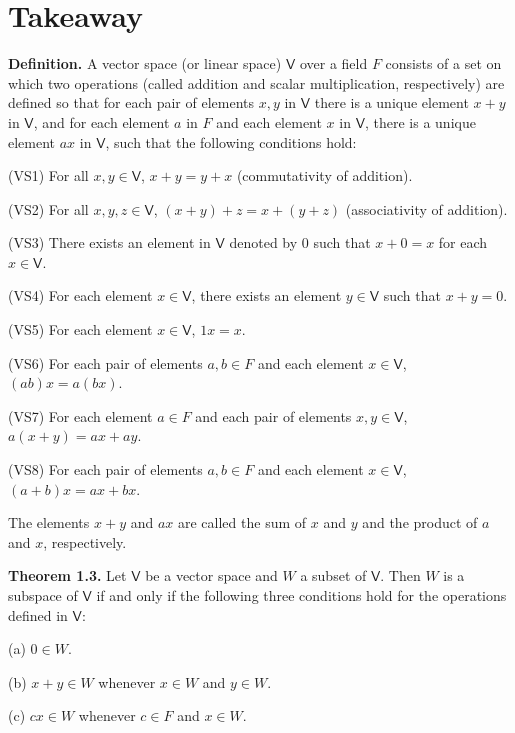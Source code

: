 \documentclass{article}
\newcommand{\0}{\mathit{0}}
\begin{document}
\newpage

\section{Takeaway}

\textbf{Definition.}
A vector space (or linear space) $\mathsf{V}$ over a field $F$ consists of
a set on which two operations (called addition and scalar multiplication,
respectively) are defined so that for each pair of elements $x, y$ in
$\mathsf{V}$ there is a unique element $x + y$ in $\mathsf{V}$, and for
each element $a$ in $F$ and each element $x$ in $\mathsf{V}$, there is a
unique element $ax$ in $\mathsf{V}$, such that the following conditions hold:

(VS1) For all $x, y \in \mathsf{V}$, $x + y = y + x$ (commutativity of addition).

(VS2) For all $x, y, z \in \mathsf{V}$, $(x + y) + z = x + (y + z)$
(associativity of addition).

(VS3) There exists an element in $\mathsf{V}$ denoted by $\0$ such that
$x + \0 = x$ for each $x \in \mathsf{V}$.

(VS4) For each element $x \in \mathsf{V}$, there exists an element
$y \in \mathsf{V}$ such that $x + y = \0$.

(VS5) For each element $x \in \mathsf{V}$, $1x = x$.

(VS6) For each pair of elements $a, b \in F$ and each element
$x \in \mathsf{V}$, $(ab)x = a(bx)$.

(VS7) For each element $a \in F$ and each pair of elements
$x, y \in \mathsf{V}$, $a(x + y) = ax + ay$.

(VS8) For each pair of elements $a, b \in F$ and each element
$x \in \mathsf{V}$, $(a + b)x = ax + bx$.

The elements $x + y$ and $ax$ are called the sum of $x$ and $y$ and the
product of $a$ and $x$, respectively.

\medskip

\textbf{Theorem 1.3.}
Let $\mathsf{V}$ be a vector space and $W$ a subset of
$\mathsf{V}$. Then $W$ is a subspace of $\mathsf{V}$ if and
only if the following three conditions hold for the operations
defined in $\mathsf{V}$:

(a) $\0 \in W$.

(b) $x + y \in W$ whenever $x \in W$ and $y \in W$.

(c) $c x \in W$ whenever $c \in F$ and $x \in W$.

\medskip
\end{document}
